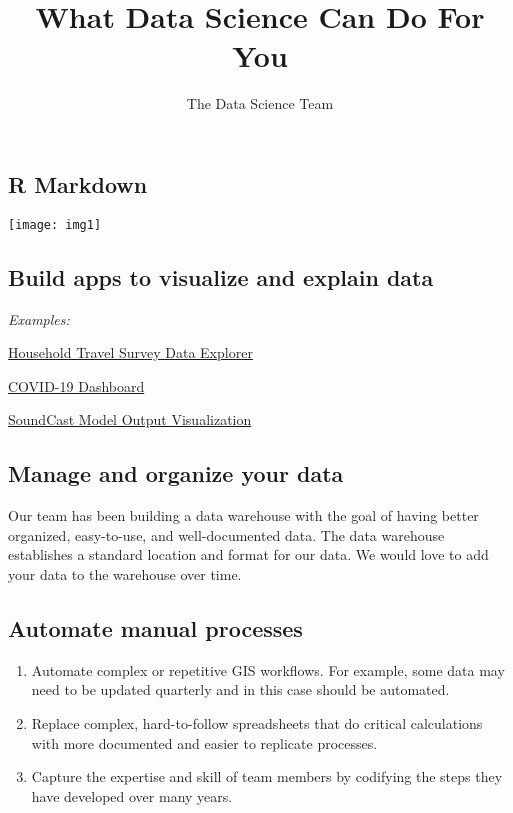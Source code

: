 \documentclass[
]{article}
\title{What Data Science Can Do For You}
\author{The Data Science Team}
\date{}
\begin{document}
\maketitle

\hypertarget{r-markdown}{%
\subsection{R Markdown}\label{r-markdown}}

\texttt{[image: img1]}

\hypertarget{build-apps-to-visualize-and-explain-data}{%
\subsection{Build apps to visualize and explain
data}\label{build-apps-to-visualize-and-explain-data}}

\emph{Examples:}

\href{http://dataexplorer.psrc.org/household-travel-survey}{Household
Travel Survey Data Explorer}

\href{http://aws-linux:3838/covid19-dashboard/}{COVID-19 Dashboard}

\href{http://aws-linux/soundcast_dash}{SoundCast Model Output
Visualization}

\hypertarget{manage-and-organize-your-data}{%
\subsection{Manage and organize your
data}\label{manage-and-organize-your-data}}

Our team has been building a data warehouse with the goal of having
better organized, easy-to-use, and well-documented data. The data
warehouse establishes a standard location and format for our data. We
would love to add your data to the warehouse over time.

\hypertarget{automate-manual-processes}{%
\subsection{Automate manual processes}\label{automate-manual-processes}}

\begin{enumerate}
\def\labelenumi{\arabic{enumi}.}
\item
  Automate complex or repetitive GIS workflows. For example, some data
  may need to be updated quarterly and in this case should be automated.
\item
  Replace complex, hard-to-follow spreadsheets that do critical
  calculations with more documented and easier to replicate processes.
\item
  Capture the expertise and skill of team members by codifying the steps
  they have developed over many years.
\end{enumerate}
\end{document}
